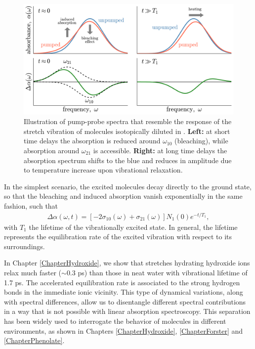 \begin{figure}[t!]
	\centering
	\includegraphics[width=0.95\figwidth]{chapters/Chapter3_Methods2/Graphs/TRVSAspects.pdf} %
	\caption{Illustration of pump-probe spectra that resemble the response of the  stretch vibration of  molecules isotopically diluted in . \textbf{Left:} at short time delays the absorption is reduced around $\omega_{10}$ (bleaching), while absorption around $\omega_{21}$ is accessible. \textbf{Right:} at long time delays the absorption spectrum shifts to the blue and reduces in amplitude due to temperature increase upon vibrational relaxation.}
	\label{TRVSAspects1}
\end{figure}



In the simplest scenario, the excited molecules decay directly to the ground state, so that the bleaching and induced absorption vanish exponentially in the same fashion, such that
\begin{eqnarray}
\Delta \alpha (\omega,t) = [ -  2 \sigma_{10} (\omega) + \sigma_{21}(\omega)] N_1 (0) e^{-t/T_1},
\label{transientabs3}
\end{eqnarray}
with $T_1$ the lifetime of the vibrationally excited state. In general, the lifetime represents the equilibration rate of the excited vibration with respect to its surroundings. 









In Chapter \ref{ChapterHydroxide}, we show that  stretches hydrating hydroxide ions relax much faster ($\sim$0.3 ps) than those in neat water with vibrational lifetime of 1.7 ps. The accelerated equilibration rate is associated to the strong hydrogen bonds in the immediate ionic vicinity. This type of dynamical variations, along with spectral differences, allow us to disentangle different spectral contributions in a way that is not possible with linear absorption spectroscopy. This separation has been widely used to interrogate the behavior of molecules in different environments, as shown in Chapters \ref{ChapterHydroxide}, \ref{ChapterForster} and \ref{ChapterPhenolate}.

